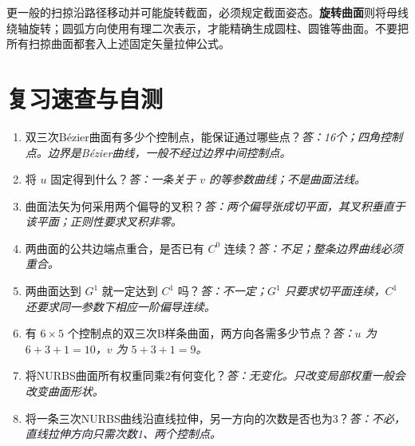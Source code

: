 
更一般的扫掠沿路径移动并可能旋转截面，必须规定截面姿态。\textbf{旋转曲面}则将母线绕轴旋转；圆弧方向使用有理二次表示，才能精确生成圆柱、圆锥等曲面。不要把所有扫掠曲面都套入上述固定矢量拉伸公式。

\Needspace{11cm}
\section{复习速查与自测}
\begin{enumerate}
 \item 双三次Bézier曲面有多少个控制点，能保证通过哪些点？\textit{答：16个；四角控制点。边界是Bézier曲线，一般不经过边界中间控制点。}
 \item 将 $u$ 固定得到什么？\textit{答：一条关于 $v$ 的等参数曲线；不是曲面法线。}
 \item 曲面法矢为何采用两个偏导的叉积？\textit{答：两个偏导张成切平面，其叉积垂直于该平面；正则性要求叉积非零。}
 \item 两曲面的公共边端点重合，是否已有 $C^0$ 连续？\textit{答：不足；整条边界曲线必须重合。}
 \item 两曲面达到 $G^1$ 就一定达到 $C^1$ 吗？\textit{答：不一定；$G^1$ 只要求切平面连续，$C^1$ 还要求同一参数下相应一阶偏导连续。}
 \item 有 $6\times5$ 个控制点的双三次B样条曲面，两方向各需多少节点？\textit{答：$u$ 为 $6+3+1=10$，$v$ 为 $5+3+1=9$。}
 \item 将NURBS曲面所有权重同乘2有何变化？\textit{答：无变化。只改变局部权重一般会改变曲面形状。}
 \item 将一条三次NURBS曲线沿直线拉伸，另一方向的次数是否也为3？\textit{答：不必，直线拉伸方向只需次数1、两个控制点。}
\end{enumerate}

